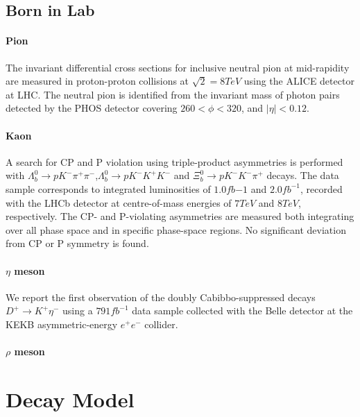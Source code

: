 \documentclass[
10pt, %
a4paper, %
oneside, %
headinclude,footinclude, %
BCOR5mm, %
]{scrartcl}
\begin{document}



\subsection{Born in Lab}

\paragraph{Pion}The invariant differential cross sections for inclusive neutral pion at mid-rapidity are measured in proton-proton collisions at $\sqrt{2} = 8 TeV$ using the ALICE detector at LHC. The neutral pion is identified from the invariant mass of photon pairs detected by the PHOS detector covering $260 < \phi < 320$, and $ |\eta| < 0.12$\cite{Yano:2310803}.
\paragraph{Kaon}A search for CP and P violation using triple-product asymmetries is performed with $\Lambda^{0}_{b}\to pK^{-}\pi^{+}\pi^{-}$,$\Lambda^{0}_{b}\to pK^{-}K^{+}K^{-}$ and $\Xi^{0}_{b}\to pK^{-}K^{-}\pi^{+}$ decays. The data sample corresponds to integrated luminosities of $1.0fb{-1}$ and $2.0fb^{-1}$, recorded with the LHCb detector at centre-of-mass energies of $7 TeV$ and $8 TeV$, respectively. The CP- and P-violating asymmetries are measured both integrating over all phase space and in specific phase-space regions. No significant deviation from CP or P symmetry is found.\cite{Aaij:2317224}
\paragraph{$\eta$ meson} We report the first observation of the doubly Cabibbo-suppressed decays $D^+\rightarrow K^+\eta^-$ using a $791fb^{-1}$ data sample collected with the Belle detector at the KEKB asymmetric-energy $e^+e^-$ collider. \cite{PhysRevLett.107.221801}
\paragraph{$\rho$ meson}\cite{Acharya:2316135}




\section{Decay Model}
\end{document}
